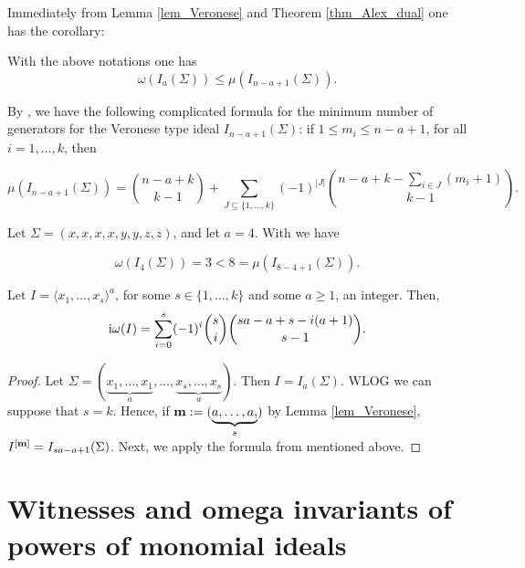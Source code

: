 \documentclass[11pt]{amsart}   %
\begin{document}
\medskip

Immediately from Lemma \ref{lem_Veronese} and Theorem \ref{thm_Alex_dual} one has the corollary:

\begin{cor}\label{cor_Veronese} With the above notations one has
$$\omega(I_a(\Sigma))\leq \mu(I_{n-a+1}(\Sigma)).$$
\end{cor}

By \cite[Theorem 2.2]{AbZa}, we have the following complicated formula for the minimum number of generators for the Veronese type ideal $I_{n-a+1}(\Sigma)$: if $1\leq m_i\leq n-a+1$, for all $i=1,\ldots,k$, then

$$\mu(I_{n-a+1}(\Sigma))={{n-a+k}\choose{k-1}}+\sum_{J\subseteq\{1,\ldots,k\}}(-1)^{|J|}{{n-a+k-\sum_{i\in J}(m_i+1)}\choose{k-1}}.$$

\begin{exm}\label{exm_Veronese} Let $\Sigma=(x,x,x,x,y,y,z,z)$, and let $a=4$. With \cite{GrSt} we have

$$\omega(I_4(\Sigma))=3 < 8 =\mu(I_{8-4+1}(\Sigma)).$$
\end{exm}
\medskip


\begin{prop}\label{prop_iomega_veronese} Let $I=\langle x_1,\ldots,x_s\rangle^a$, for some $s\in\{1,\ldots,k\}$ and some $a\geq 1$, an integer. Then,
    $${\rm i}\omega(I)=\sum_{i=0}^s(-1)^{i}{{s}\choose{i}}{{sa-a+s-i(a+1)}\choose{s-1}}.$$
\end{prop}
\begin{proof}
    Let $\Sigma=(\underbrace{x_1,\ldots,x_1}_{a},\ldots,\underbrace{x_s,\ldots,x_s}_{a})$. Then $I=I_a(\Sigma)$. WLOG we can suppose that $s=k$. Hence, if ${\bf m}:=(\underbrace{a,\ldots,a,}_{s})$ by Lemma \ref{lem_Veronese}, $I^{[{\bf m}]}=I_{sa-a+1}(\Sigma)$. Next, we apply the formula from \cite[Theorem 2.2]{AbZa} mentioned above. 
\end{proof}

\section{Witnesses and omega invariants of powers of monomial ideals}
\label{Matrix_Method}
\end{document}
